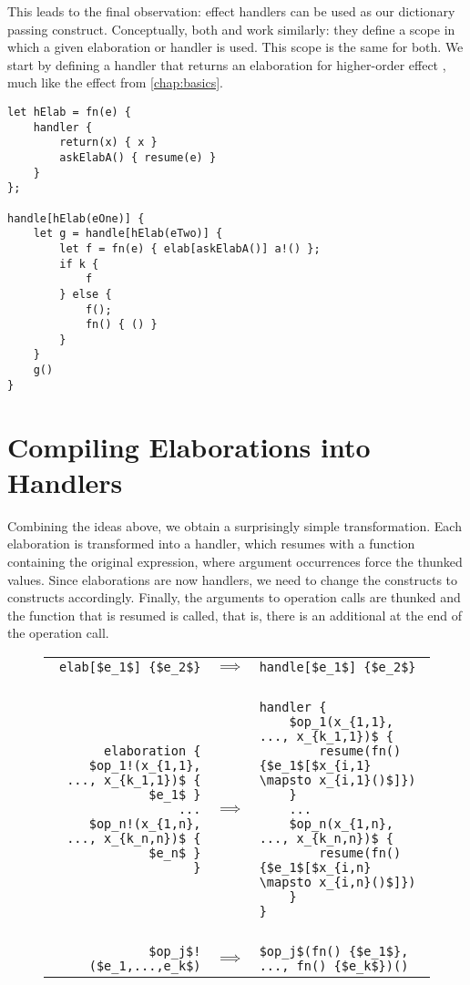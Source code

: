 This leads to the final observation: effect handlers can be used as our dictionary passing construct. Conceptually, both  and  work similarly: they define a scope in which a given elaboration or handler is used. This scope is the same for both. We start by defining a handler that returns an elaboration for higher-order effect , much like the  effect from \cref{chap:basics}.

\begin{lstlisting}[language=elaine,style=fancy]
let hElab = fn(e) {
    handler {
        return(x) { x }
        askElabA() { resume(e) }
    }
};

handle[hElab(eOne)] {
    let g = handle[hElab(eTwo)] {
        let f = fn(e) { elab[askElabA()] a!() };
        if k {
            f
        } else {
            f();
            fn() { () }
        }
    }
    g()
}
\end{lstlisting}

\section{Compiling Elaborations into Handlers}

Combining the ideas above, we obtain a surprisingly simple transformation. Each elaboration is transformed into a handler, which resumes with a function containing the original expression, where argument occurrences force the thunked values. Since elaborations are now handlers, we need to change the  constructs to  constructs accordingly. Finally, the arguments to operation calls are thunked and the function that is resumed is called, that is, there is an additional \el{()} at the end of the operation call.

\begin{figure}[h]
\begin{tabular}{rcl}
\lstinline|elab[$e_1$] {$e_2$}|
& $\implies$
& \lstinline|handle[$e_1$] {$e_2$}|
\\\\
\begin{lstlisting}
elaboration {
    $op_1!(x_{1,1}, ..., x_{k_1,1})$ { $e_1$ }
    ...
    $op_n!(x_{1,n}, ..., x_{k_n,n})$ { $e_n$ }
}
\end{lstlisting}
&$\implies$
&\begin{lstlisting}
handler {
    $op_1(x_{1,1}, ..., x_{k_1,1})$ {
        resume(fn() {$e_1$[$x_{i,1} \mapsto x_{i,1}()$]})
    }
    ...
    $op_n(x_{1,n}, ..., x_{k_n,n})$ {
        resume(fn() {$e_1$[$x_{i,n} \mapsto x_{i,n}()$]})
    }
}
\end{lstlisting}
\\\\
\lstinline|$op_j$!($e_1,...,e_k$)|
& $\implies$
& \lstinline|$op_j$(fn() {$e_1$}, ..., fn() {$e_k$})()|
\end{tabular}
\end{figure}

